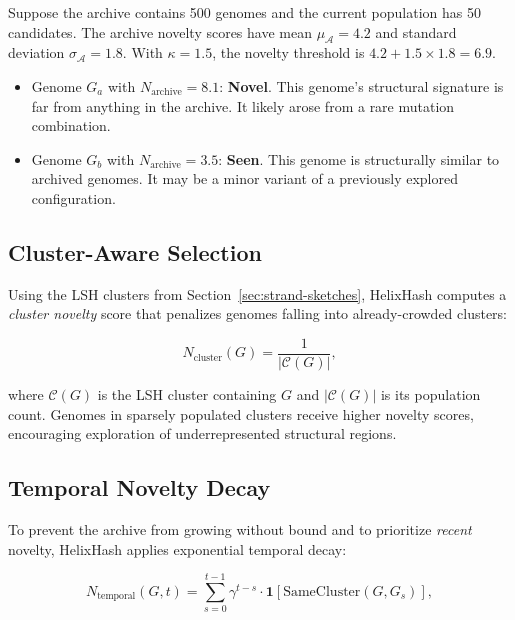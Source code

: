 \begin{example}
\label{ex:novel-seen}
Suppose the archive contains 500 genomes and the current population has 50 candidates. The archive novelty scores have mean $\mu_{\mathcal{A}} = 4.2$ and standard deviation $\sigma_{\mathcal{A}} = 1.8$. With $\kappa = 1.5$, the novelty threshold is $4.2 + 1.5 \times 1.8 = 6.9$.

\begin{itemize}[leftmargin=1.5em]
  \item Genome $G_a$ with $N_{\text{archive}} = 8.1$: \textbf{Novel}. This genome's structural signature is far from anything in the archive. It likely arose from a rare mutation combination.
  \item Genome $G_b$ with $N_{\text{archive}} = 3.5$: \textbf{Seen}. This genome is structurally similar to archived genomes. It may be a minor variant of a previously explored configuration.
\end{itemize}
\end{example}

\subsection{Cluster-Aware Selection}

Using the LSH clusters from Section~\ref{sec:strand-sketches}, HelixHash computes a \emph{cluster novelty} score that penalizes genomes falling into already-crowded clusters:

\begin{equation}
N_{\text{cluster}}(G) = \frac{1}{|\mathcal{C}(G)|},
\label{eq:cluster-novelty}
\end{equation}

where $\mathcal{C}(G)$ is the LSH cluster containing $G$ and $|\mathcal{C}(G)|$ is its population count. Genomes in sparsely populated clusters receive higher novelty scores, encouraging exploration of underrepresented structural regions.

\subsection{Temporal Novelty Decay}

To prevent the archive from growing without bound and to prioritize \emph{recent} novelty, HelixHash applies exponential temporal decay:

\begin{equation}
N_{\text{temporal}}(G, t) = \sum_{s=0}^{t-1} \gamma^{t - s} \cdot \mathbf{1}[\mathrm{SameCluster}(G, G_s)],
\label{eq:temporal-novelty}
\end{equation}

